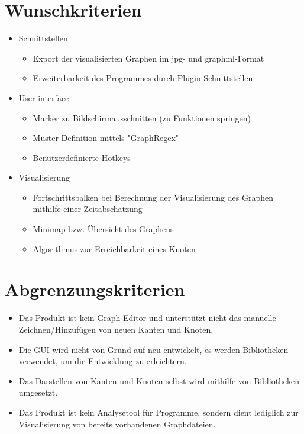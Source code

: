 \section{Wunschkriterien}

\begin{itemize}
\item Schnittstellen
\begin{itemize}
\item Export der visualisierten Graphen im \gls{jpg}- und \gls{graphml}-Format
\item Erweiterbarkeit des Programmes durch Plugin Schnittstellen
\end{itemize}
\item User interface
\begin{itemize}
\item Marker zu Bildschirmausschnitten (zu Funktionen springen)
\item Muster Definition mittels "GraphRegex"
\item Benutzerdefinierte Hotkeys
\end{itemize}
\item Visualisierung
\begin{itemize}
\item Fortschrittsbalken bei Berechnung der Visualisierung des Graphen mithilfe einer Zeitabschätzung
\item Minimap bzw. Übersicht des Graphens
\item Algorithmus zur Erreichbarkeit eines Knoten
\end{itemize}
\end{itemize}

\section{Abgrenzungskriterien}

\begin{itemize}
\item Das Produkt ist kein Graph Editor und unterstützt nicht das manuelle Zeichnen/Hinzufügen von neuen Kanten und Knoten.
\item Die GUI wird nicht von Grund auf neu entwickelt, es werden Bibliotheken verwendet, um die Entwicklung zu erleichtern.
\item Das Darstellen von Kanten und Knoten selbst wird mithilfe von Bibliotheken umgesetzt.
\item Das Produkt ist kein Analysetool für Programme, sondern dient lediglich zur Visualisierung von bereits vorhandenen Graphdateien.
\end{itemize}
